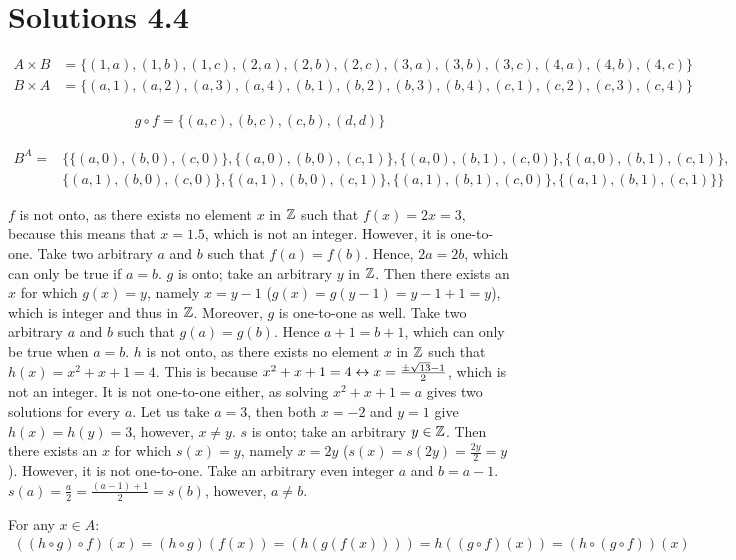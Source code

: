 \section*{Solutions 4.4}
\begin{solutions}
	\solution\begin{align*}
	A\times B&=\{(1,a), (1,b), (1,c), (2,a), (2,b), (2,c), (3,a),(3,b),(3,c),(4,a),(4,b),(4,c)\}\\
	B\times A&=\{(a,1),(a,2),(a,3),(a,4),(b,1),(b,2),(b,3),(b,4),(c,1),(c,2),(c,3),(c,4)\}
	\end{align*}

	\solution\begin{align*}
	g\circ f=\{(a,c), (b,c),(c,b),(d,d)\}
	\end{align*}

	\solution\begin{align*}
	B^A=&\{\{(a,0), (b,0), (c,0)\},
	\{(a,0), (b,0), (c,1)\},
	\{(a,0), (b,1), (c,0)\},
	\{(a,0), (b,1), (c,1)\},\\
	&\{(a,1), (b,0), (c,0)\},
	\{(a,1), (b,0), (c,1)\},
	\{(a,1), (b,1), (c,0)\},
	\{(a,1), (b,1), (c,1)\}\}
	\end{align*}

	\solution
		\spart $f$ is not onto, as there exists no element $x$ in ${\mathbb Z}$ such that $f(x)=2x=3$, because this means that $x=1.5$, which is not an integer. However, it is one-to-one. Take two arbitrary $a$ and $b$ such that $f(a)=f(b)$. Hence, $2a=2b$, which can only be true if $a=b$.
		\spart $g$ is onto; take an arbitrary $y$ in ${\mathbb Z}$. Then there exists an $x$ for which $g(x)=y$, namely $x=y-1$ ($g(x)=g(y-1)=y-1+1=y$), which is integer and thus in $ {\mathbb Z}$. Moreover, $g$ is one-to-one as well. Take two arbitrary $a$ and $b$ such that $g(a)=g(b)$. Hence $a+1=b+1$, which can only be true when $a=b$.
		\spart $h$ is not onto, as there exists no element $x$ in ${\mathbb Z}$ such that $h(x)=x^2+x+1=4$. This is because $x^2+x+1=4\leftrightarrow x=\frac{\pm\sqrt{13}-1}{2}$, which is not an integer. It is not one-to-one either, as solving $x^2+x+1=a$ gives two solutions for every $a$. Let us take $a=3$, then both $x=-2$ and $y=1$ give $h(x)=h(y)=3$, however, $x\neq y$.
		\spart $s$ is onto; take an arbitrary $y\in{\mathbb Z}$. Then there exists an $x$ for which $s(x)=y$, namely $x=2y$ ($s(x)=s(2y)=\frac{2y}{2}=y$). However, it is not one-to-one. Take an arbitrary even integer $a$ and $b=a-1$. $s(a)=\frac{a}{2}=\frac{(a-1)+1}{2}=s(b)$, however, $a\neq b$.

	\solution For any $x\in A$:
	\begin{align*}
	((h\circ g)\circ f)(x)=(h\circ g)(f(x))=(h(g(f(x))))=h((g\circ f)(x))=(h\circ (g\circ f))(x)
	\end{align*}


\end{solutions}
